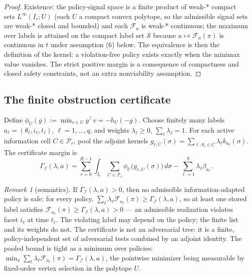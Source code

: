 \documentclass[10pt,twocolumn]{article}
\theoremstyle{plain}
\theoremstyle{definition}
\theoremstyle{remark}
\newtheorem{remark}[theorem]{Remark}
\begin{document}
\begin{proof}
Existence: the policy-signal space is a finite product of weak-*
compact sets \(L^\infty(I_r; U)\) (each \(U\) a compact convex
polytope, so the admissible signal sets are weak-* closed and bounded)
and each \(\mathcal{F}_a\) is weak-* continuous; the maximum over
labels is attained on the compact label set \(\mathscr{S}\) because
\(a \mapsto \mathcal{F}_a(\pi)\) is continuous in \(t\) under
assumption (6) below. The equivalence is then the definition of the
kernel: a violation-free policy exists exactly when the minimax value
vanishes. The strict positive margin is a consequence of compactness
and closed safety constraints, not an extra nonviability assumption.
\end{proof}

\subsection{The finite obstruction certificate}\label{lp-certificate}

Define \(\phi_U(g) := \min_{v \in U} g^\top v = -h_U(-g)\). Choose finitely
many labels \(a_\ell = (\theta_\ell, i_\ell, t_\ell)\), \(\ell = 1,\dots,q\),
and weights \(\lambda_\ell \ge 0\), \(\sum_\ell \lambda_\ell = 1\). For each
active information cell \(C \in \mathcal{P}_r\), pool the adjoint kernels
\(g_{r,C}(\sigma) = \sum_{\ell : \theta_\ell \in C} \lambda_\ell
k_{a_\ell}(\sigma)\). The certificate margin is
\[
\Gamma_{\mathcal{I}}(\lambda, a)
= \sum_{r=0}^{R-1} \int_{I_r} \sum_{C \in \mathcal{P}_r}
\phi_U\!\bigl(g_{r,C}(\sigma)\bigr)\, d\sigma
- \sum_{\ell=1}^q \lambda_\ell \beta_{a_\ell}.
\tag{1}
\]

\begin{remark}[semantics]\label{lp-rem:semantics}
If \(\Gamma_{\mathcal{I}}(\lambda, a) > 0\), then no admissible
information-adapted policy is safe: for every policy,
\(\sum_\ell \lambda_\ell \mathcal{F}_{a_\ell}(\pi) \ge
\Gamma_{\mathcal{I}}(\lambda, a)\), so at least one stored label satisfies
\(\mathcal{F}_{a_\ell}(\pi) \ge \Gamma_{\mathcal{I}}(\lambda, a) > 0\) ---
an admissible realization violates facet \(i_\ell\) at time \(t_\ell\). The
violating label may depend on the policy; the finite list and its weights do
not. The certificate is not an adversarial tree: it is a finite,
policy-independent set of adversarial tests combined by an adjoint identity.
The pooled bound is tight as a minimum over policies:
\(\min_{\pi} \sum_\ell \lambda_\ell \mathcal{F}_{a_\ell}(\pi) =
\Gamma_{\mathcal{I}}(\lambda, a)\), the pointwise minimizer being
measurable by fixed-order vertex selection in the polytope \(U\).
\end{remark}
\end{document}
